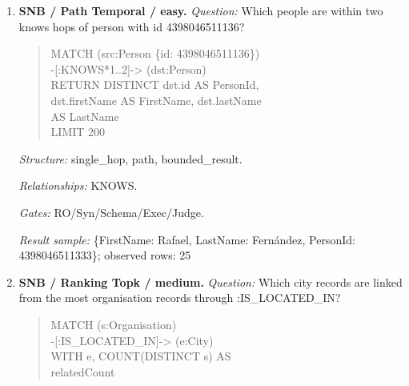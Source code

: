 \begin{enumerate}
\textit{Question:} Which person records are not linked from any message record through :HAS\_CREATOR?
\begin{quote}\scriptsize\ttfamily\raggedright\sloppy
MATCH (p:Person)\\
WHERE NOT EXISTS((:Message)\\
-[:HAS\_CREATOR]-\textgreater{} (p))\\
RETURN DISTINCT p.id AS PersonId,\\
p.firstName AS PersonFirstName,\\
p.lastName AS PersonLastName
\end{quote}
\textit{Structure:} single\_hop, negation.\par
\textit{Relationships:} HAS\_CREATOR.\par
\textit{Gates:} RO/Syn/Schema/Exec/Judge.\par
\textit{Result sample:} \{PersonFirstName: R., PersonId: 8796093022313, PersonLastName: Rao\}; observed rows: 25
\item \textbf{SNB / Path Temporal / easy.}
\textit{Question:} Which people are within two knows hops of person with id 4398046511136?
\begin{quote}\scriptsize\ttfamily\raggedright\sloppy
MATCH (src:Person \{id: 4398046511136\})\\
-[:KNOWS*1..2]-\textgreater{} (dst:Person)\\
RETURN DISTINCT dst.id AS PersonId,\\
dst.firstName AS FirstName, dst.lastName\\
AS LastName\\
LIMIT 200
\end{quote}
\textit{Structure:} single\_hop, path, bounded\_result.\par
\textit{Relationships:} KNOWS.\par
\textit{Gates:} RO/Syn/Schema/Exec/Judge.\par
\textit{Result sample:} \{FirstName: Rafael, LastName: Fernández, PersonId: 4398046511333\}; observed rows: 25
\item \textbf{SNB / Ranking Topk / medium.}
\textit{Question:} Which city records are linked from the most organisation records through :IS\_LOCATED\_IN?
\begin{quote}\scriptsize\ttfamily\raggedright\sloppy
MATCH (s:Organisation)\\
-[:IS\_LOCATED\_IN]-\textgreater{} (e:City)\\
WITH e, COUNT(DISTINCT s) AS\\
relatedCount\\

\end{quote}
\end{enumerate}
